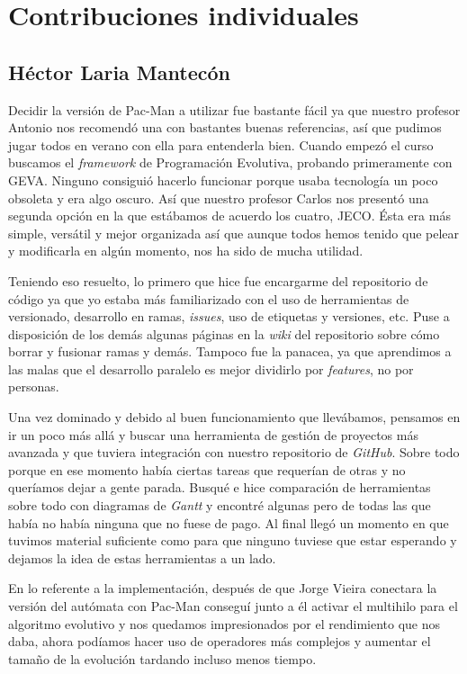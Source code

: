 \chapter{Contribuciones individuales} \label{cap:contribuciones}

\section{Héctor Laria Mantecón}
Decidir la versión de Pac-Man a utilizar fue bastante fácil ya que nuestro profesor Antonio nos recomendó una con bastantes buenas referencias, así que pudimos jugar todos en verano con ella para entenderla bien. Cuando empezó el curso buscamos el \textit{framework} de Programación Evolutiva, probando primeramente con GEVA. Ninguno consiguió hacerlo funcionar porque usaba tecnología un poco obsoleta y era algo oscuro. Así que nuestro profesor Carlos nos presentó una segunda opción en la que estábamos de acuerdo los cuatro, JECO. Ésta era más simple, versátil y mejor organizada así que aunque todos hemos tenido que pelear y modificarla en algún momento, nos ha sido de mucha utilidad.

Teniendo eso resuelto, lo primero que hice fue encargarme del repositorio de código ya que yo estaba más familiarizado con el uso de herramientas de versionado, desarrollo en ramas, \textit{issues}, uso de etiquetas y versiones, etc. Puse a disposición de los demás algunas páginas en la \textit{wiki} del repositorio sobre cómo borrar y fusionar ramas y demás. Tampoco fue la panacea, ya que aprendimos a las malas que el desarrollo paralelo es mejor dividirlo por \textit{features}, no por personas.

Una vez dominado y debido al buen funcionamiento que llevábamos, pensamos en ir un poco más allá y buscar una herramienta de gestión de proyectos más avanzada y que tuviera integración con nuestro repositorio de \textit{GitHub}. Sobre todo porque en ese momento había ciertas tareas que requerían de otras y no queríamos dejar a gente parada. Busqué e hice comparación de herramientas sobre todo con diagramas de \textit{Gantt} y encontré algunas pero de todas las que había no había ninguna que no fuese de pago. Al final llegó un momento en que tuvimos material suficiente como para que ninguno tuviese que estar esperando y dejamos la idea de estas herramientas a un lado.

En lo referente a la implementación, después de que Jorge Vieira conectara la versión del autómata con Pac-Man conseguí junto a él activar el multihilo para el algoritmo evolutivo y nos quedamos impresionados por el rendimiento que nos daba, ahora podíamos hacer uso de operadores más complejos y aumentar el tamaño de la evolución tardando incluso menos tiempo.

